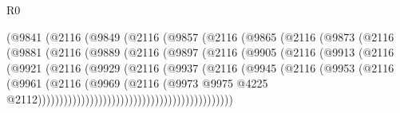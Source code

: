 \begin{lexlean}{R0}
\begin{coremodule}
                        (@9841
                          (@2116
                            (@9849
                              (@2116
                                (@9857
                                  (@2116
                                    (@9865
                                      (@2116
                                        (@9873
                                          (@2116
                                            (@9881
                                              (@2116
                                                (@9889
                                                  (@2116
                                                    (@9897
                                                      (@2116
                                                        (@9905
                                                          (@2116
                                                            (@9913
                                                              (@2116
                                                                (@9921
                                                                  (@2116
                                                                    (@9929
                                                                      (@2116
                                                                        (@9937
                                                                          (@2116
                                                                            (@9945
                                                                              (@2116
                                                                                (@9953
                                                                                  (@2116
                                                                                    (@9961
                                                                                      (@2116
                                                                                        (@9969
                                                                                          (@2116
                                                                                            (@9973
                                                                                              @9975
                                                                                              @4225
                                                                                              @2112)))))))))))))))))))))))))))))))))))))))))))))

\end{coremodule}
\end{lexlean}
